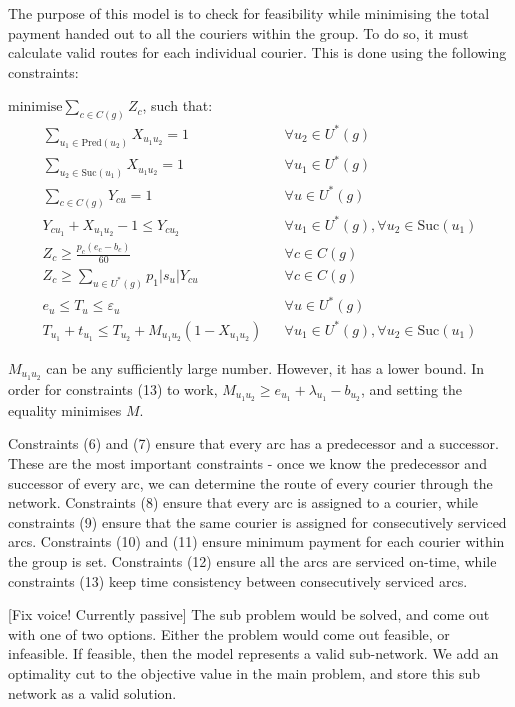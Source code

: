 \documentclass{article}
\newcommand{\Pred}{\text{Pred}}
\newcommand{\Suc}{\text{Suc}}
\begin{document}
The purpose of this model is to check for feasibility while minimising the total payment handed out to all the couriers within the group. To do so, it must calculate valid routes for each individual courier. This is done using the following constraints:

$\text{minimise}\sum_{c\in C(g)}Z_c$, such that:
\begin{align}
\sum_{u_1\in\Pred(u_2)}X_{u_1u_2}=1&&\forall u_2\in U^*(g)\\
\sum_{u_2\in\Suc(u_1)}X_{u_1u_2}=1&&\forall u_1\in U^*(g)\\
\sum_{c\in C(g)}Y_{cu}=1&&\forall u\in U^*(g)\\
Y_{cu_1}+X_{u_1u_2}-1\leq Y_{cu_2}&&\forall u_1\in U^*(g),\forall u_2\in\Suc(u_1)\\
Z_c\geq\frac{p_c(e_c-b_c)}{60}&&\forall c\in C(g)\\
Z_c\geq\sum_{u\in U^*(g)}p_1|s_u|Y_{cu}&&\forall c\in C(g)\\
e_u\leq T_u\leq\varepsilon_u&&\forall u\in U^*(g)\\
T_{u_1}+t_{u_1}\leq T_{u_2}+M_{u_1u_2}(1-X_{u_1u_2})&&\forall u_1\in U^*(g),\forall u_2\in\Suc(u_1)
\end{align}

$M_{u_1u_2}$ can be any sufficiently large number. However, it has a lower bound. In order for constraints (13) to work, $M_{u_1u_2}\geq e_{u_1}+\lambda_{u_1}-b_{u_2}$, and setting the equality minimises $M$.

Constraints (6) and (7) ensure that every arc has a predecessor and a successor. These are the most important constraints - once we know the predecessor and successor of every arc, we can determine the route of every courier through the network. Constraints (8) ensure that every arc is assigned to a courier, while constraints (9) ensure that the same courier is assigned for consecutively serviced arcs. Constraints (10) and (11) ensure minimum payment for each courier within the group is set. Constraints (12) ensure all the arcs are serviced on-time, while constraints (13) keep time consistency between consecutively serviced arcs.

[Fix voice! Currently passive]
The sub problem would be solved, and come out with one of two options. Either the problem would come out feasible, or infeasible. If feasible, then the model represents a valid sub-network. We add an optimality cut to the objective value in the main problem, and store this sub network as a valid solution.
\end{document}
